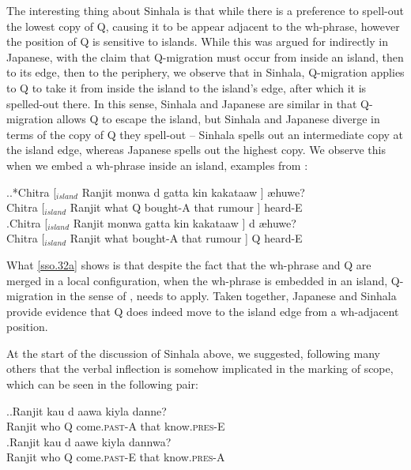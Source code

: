 \documentclass{glossa}
\begin{document}
The interesting thing about Sinhala is that while there is a preference to spell-out the lowest copy of Q, causing it to be appear adjacent to the wh-phrase, however the position of Q is sensitive to islands. While this was argued for indirectly in Japanese, with the claim that Q-migration must occur from inside an island, then to its edge, then to the periphery, we observe that in Sinhala, Q-migration applies to Q to take it from inside the island to the island's edge, after which it is spelled-out there. In this sense, Sinhala and Japanese are similar in that Q-migration allows Q to escape the island, but Sinhala and Japanese diverge in terms of the copy of Q they spell-out -- Sinhala spells out an intermediate copy at the island edge, whereas Japanese spells out the highest copy. We observe this when we embed a wh-phrase inside an island, examples from \cite{slade:2011}:

\ex.\ag.*\label{sso.32a}Chitra [$_{island}$ Ranjit mon{\textschwa}wa d{\textschwa} gatta ki{\textschwa}n{\textschwa} kakataaw{\textschwa} ] {\ae}huwe?\\
   Chitra [$_{island}$ Ranjit what Q bought-A that rumour ] heard-E\\
   \bg.\label{sso.32b}Chitra [$_{island}$ Ranjit mon{\textschwa}wa gatta ki{\textschwa}n{\textschwa} kakataaw{\textschwa} ] d{\textschwa} {\ae}huwe?\\
   Chitra [$_{island}$ Ranjit what bought-A that rumour ] Q heard-E\\

What \ref{sso.32a} shows is that despite the fact that the wh-phrase and Q are merged in a local configuration, when the wh-phrase is embedded in an island, Q-migration in the sense of \cite{hagstrom:1998}, needs to apply. Taken together, Japanese and Sinhala provide evidence that Q does indeed move to the island edge from a wh-adjacent position.

At the start of the discussion of Sinhala above, we suggested, following many others \citep{hagstrom:1998, kishimoto:1992, kishimoto:2005, slade:2011} that the verbal inflection is somehow implicated in the marking of scope, which can be seen in the following pair:

\ex.\ag.\label{sso.33a}Ranjit kau d{\textschwa} aawa kiy{\textschwa}la danne?\\
   Ranjit who Q come.\textsc{past}-A that know.\textsc{pres}-E\\
   \bg.\label{sso.33b}Ranjit kau d{\textschwa} aawe kiy{\textschwa}la dann{\textschwa}wa?\\
   Ranjit who Q come.\textsc{past}-E that know.\textsc{pres}-A\\
\end{document}
